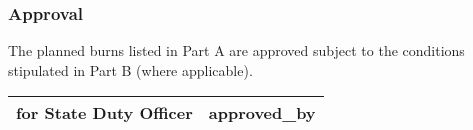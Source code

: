 \subsubsection{Approval}
The planned burns listed in Part A are approved subject to the conditions stipulated in Part B (where applicable).
\begin{tabu} to \linewidth { | X[0.4] | X | }
\hline
\textbf{for State Duty Officer} & \textbf{ {{ approved_by }} } \\
\hline
\end{tabu}\\%

\clearpage
